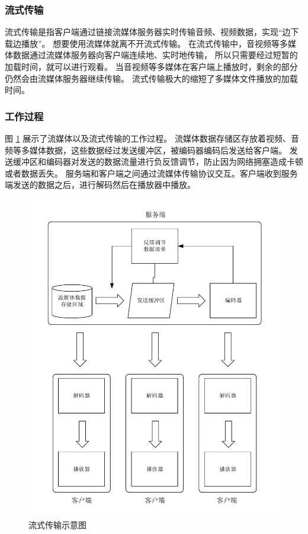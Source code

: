 \subsubsection{流式传输}
流式传输是指客户端通过链接流媒体服务器实时传输音频、视频数据，实现“边下载边播放”。
想要使用流媒体就离不开流式传输。
在流式传输中，音视频等多媒体数据通过流媒体服务器向客户端连续地、实时地传输，
所以只需要经过短暂的加载时间，就可以进行观看。
当音视频等多媒体在客户端上播放时，剩余的部分仍然会由流媒体服务器继续传输。
流式传输极大的缩短了多媒体文件播放的加载时间。

\subsubsection{工作过程}
图 \ref{Fig:server} 展示了流媒体以及流式传输的工作过程。
流媒体数据存储区存放着视频、音频等多媒体数据，这些数据经过发送缓冲区，被编码器编码后发送给客户端。
发送缓冲区和编码器对发送的数据流量进行负反馈调节，防止因为网络拥塞造成卡顿或者数据丢失。
服务端和客户端之间通过流媒体传输协议交互。客户端收到服务端发送的数据之后，进行解码然后在播放器中播放。

\begin{figure}[ht]
    \centering
    \includegraphics[width=0.8\linewidth]{./Figure/IMG_server.pdf}
    \caption{流式传输示意图}
    \label{Fig:server}
\end{figure}

